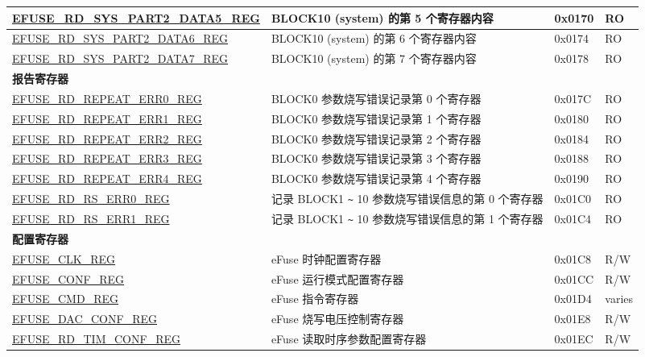 \begin{longtable}{ | p{6cm} | p{7.2cm} | p{1.3cm} | p{1cm} | }
\hyperref[regdesc:EFUSERDSYSPART2DATA5REG]{EFUSE\_RD\_SYS\_PART2\_DATA5\_REG} & BLOCK10 (system) 的第 5 个寄存器内容  & 0x0170 & RO \\ \hline
\hyperref[regdesc:EFUSERDSYSPART2DATA6REG]{EFUSE\_RD\_SYS\_PART2\_DATA6\_REG} & BLOCK10 (system) 的第 6 个寄存器内容  & 0x0174 & RO \\ \hline
\hyperref[regdesc:EFUSERDSYSPART2DATA7REG]{EFUSE\_RD\_SYS\_PART2\_DATA7\_REG} & BLOCK10 (system) 的第 7 个寄存器内容  & 0x0178 & RO \\ \hline
\multicolumn{4}{|l|}{\textbf{报告寄存器}} \\ \hline
\hyperref[regdesc:EFUSERDREPEATERR0REG]{EFUSE\_RD\_REPEAT\_ERR0\_REG} & BLOCK0 参数烧写错误记录第 0 个寄存器  & 0x017C & RO \\ \hline
\hyperref[regdesc:EFUSERDREPEATERR1REG]{EFUSE\_RD\_REPEAT\_ERR1\_REG} & BLOCK0 参数烧写错误记录第 1 个寄存器  & 0x0180 & RO \\ \hline
\hyperref[regdesc:EFUSERDREPEATERR2REG]{EFUSE\_RD\_REPEAT\_ERR2\_REG} & BLOCK0 参数烧写错误记录第 2 个寄存器  & 0x0184 & RO \\ \hline
\hyperref[regdesc:EFUSERDREPEATERR3REG]{EFUSE\_RD\_REPEAT\_ERR3\_REG} & BLOCK0 参数烧写错误记录第 3 个寄存器  & 0x0188 & RO \\ \hline
\hyperref[regdesc:EFUSERDREPEATERR4REG]{EFUSE\_RD\_REPEAT\_ERR4\_REG} & BLOCK0 参数烧写错误记录第 4 个寄存器  & 0x0190 & RO \\ \hline
\hyperref[regdesc:EFUSERDRSERR0REG]{EFUSE\_RD\_RS\_ERR0\_REG} & 记录 BLOCK1 \verb+~+ 10 参数烧写错误信息的第 0 个寄存器  & 0x01C0 & RO \\ \hline
\hyperref[regdesc:EFUSERDRSERR1REG]{EFUSE\_RD\_RS\_ERR1\_REG} & 记录 BLOCK1 \verb+~+ 10 参数烧写错误信息的第 1 个寄存器  & 0x01C4 & RO \\ \hline
\multicolumn{4}{|l|}{\textbf{配置寄存器}} \\ \hline
\hyperref[regdesc:EFUSECLKREG]{EFUSE\_CLK\_REG} & eFuse 时钟配置寄存器  & 0x01C8 & R/W \\ \hline
\hyperref[regdesc:EFUSECONFREG]{EFUSE\_CONF\_REG} & eFuse 运行模式配置寄存器 & 0x01CC & R/W \\ \hline
\hyperref[regdesc:EFUSECMDREG]{EFUSE\_CMD\_REG} & eFuse 指令寄存器  & 0x01D4 & varies \\ \hline
\hyperref[regdesc:EFUSEDACCONFREG]{EFUSE\_DAC\_CONF\_REG} & eFuse 烧写电压控制寄存器  & 0x01E8 & R/W \\ \hline
\hyperref[regdesc:EFUSERDTIMCONFREG]{EFUSE\_RD\_TIM\_CONF\_REG} & eFuse 读取时序参数配置寄存器  & 0x01EC & R/W \\ \hline

\end{longtable}
